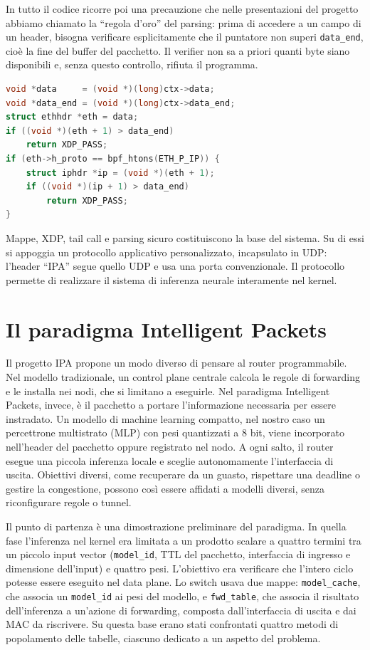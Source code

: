\documentclass[binding=0.6cm,italian,oneside,noexaminfo]{sapthesis}
\begin{document}
In tutto il codice ricorre poi una precauzione che nelle presentazioni del progetto abbiamo chiamato la ``regola d'oro'' del parsing: prima di accedere a un campo di un header, bisogna verificare esplicitamente che il puntatore non superi \texttt{data\_end}, cioè la fine del buffer del pacchetto. Il verifier non sa a priori quanti byte siano disponibili e, senza questo controllo, rifiuta il programma.

\begin{lstlisting}[language=C,caption={La regola d'oro: controllo dei limiti prima di ogni accesso}]
void *data     = (void *)(long)ctx->data;
void *data_end = (void *)(long)ctx->data_end;
struct ethhdr *eth = data;
if ((void *)(eth + 1) > data_end)
    return XDP_PASS;
if (eth->h_proto == bpf_htons(ETH_P_IP)) {
    struct iphdr *ip = (void *)(eth + 1);
    if ((void *)(ip + 1) > data_end)
        return XDP_PASS;
}
\end{lstlisting}

Mappe, XDP, tail call e parsing sicuro costituiscono la base del sistema. Su di essi si appoggia un protocollo applicativo personalizzato, incapsulato in UDP: l'header ``IPA'' segue quello UDP e usa una porta convenzionale. Il protocollo permette di realizzare il sistema di inferenza neurale interamente nel kernel.

\section{Il paradigma Intelligent Packets}
\label{sec:ipa}

Il progetto IPA propone un modo diverso di pensare al router programmabile. Nel modello tradizionale, un control plane centrale calcola le regole di forwarding e le installa nei nodi, che si limitano a eseguirle. Nel paradigma Intelligent Packets, invece, è il pacchetto a portare l'informazione necessaria per essere instradato. Un modello di machine learning compatto, nel nostro caso un percettrone multistrato (MLP) con pesi quantizzati a 8 bit, viene incorporato nell'header del pacchetto oppure registrato nel nodo. A ogni salto, il router esegue una piccola inferenza locale e sceglie autonomamente l'interfaccia di uscita. Obiettivi diversi, come recuperare da un guasto, rispettare una deadline o gestire la congestione, possono così essere affidati a modelli diversi, senza riconfigurare regole o tunnel.

Il punto di partenza è una dimostrazione preliminare del paradigma. In quella fase l'inferenza nel kernel era limitata a un prodotto scalare a quattro termini tra un piccolo input vector (\texttt{model\_id}, TTL del pacchetto, interfaccia di ingresso e dimensione dell'input) e quattro pesi. L'obiettivo era verificare che l'intero ciclo potesse essere eseguito nel data plane. Lo switch usava due mappe: \texttt{model\_cache}, che associa un \texttt{model\_id} ai pesi del modello, e \texttt{fwd\_table}, che associa il risultato dell'inferenza a un'azione di forwarding, composta dall'interfaccia di uscita e dai MAC da riscrivere. Su questa base erano stati confrontati quattro metodi di popolamento delle tabelle, ciascuno dedicato a un aspetto del problema.
\end{document}
